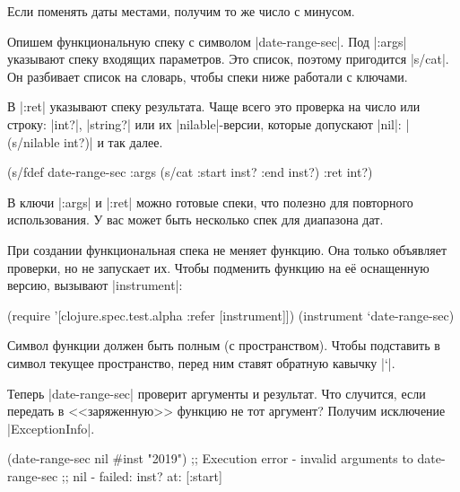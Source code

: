 \noindent
Если поменять даты местами, получим то же число с минусом.

Опишем функциональную спеку с символом \spverb|date-range-sec|. Под
\spverb|:args| указывают спеку входящих параметров. Это список, поэтому
пригодится \spverb|s/cat|. Он разбивает список на словарь, чтобы спеки ниже
работали с ключами.

В \spverb|:ret| указывают спеку результата. Чаще всего это проверка на число или
строку: \spverb|int?|, \spverb|string?| или их \spverb|nilable|-версии, которые
допускают \spverb|nil|: \spverb|(s/nilable int?)| и так далее.


\begin{english}
  \begin{clojure}
(s/fdef date-range-sec
  :args (s/cat :start inst? :end inst?)
  :ret int?)
  \end{clojure}
\end{english}

В ключи \spverb|:args| и \spverb|:ret| можно готовые спеки, что полезно для
повторного использования. У вас может быть несколько спек для диапазона дат.

При создании функциональная спека не меняет функцию. Она только объявляет
проверки, но не запускает их. Чтобы подменить функцию на е\"{е} оснащенную версию,
вызывают \spverb|instrument|:

\begin{english}
  \begin{clojure}
(require '[clojure.spec.test.alpha :refer [instrument]])
(instrument `date-range-sec)
  \end{clojure}
\end{english}

Символ функции должен быть полным (с пространством). Чтобы подставить в символ
текущее пространство, перед ним ставят обратную кавычку \spverb|`|.

Теперь \spverb|date-range-sec| проверит аргументы и результат. Что случится,
если передать в <<заряженную>> функцию не тот аргумент? Получим исключение
\spverb|ExceptionInfo|.

\begin{english}
  \begin{clojure}
(date-range-sec nil #inst "2019")
;; Execution error - invalid arguments to date-range-sec
;; nil - failed: inst? at: [:start]
  \end{clojure}
\end{english}

